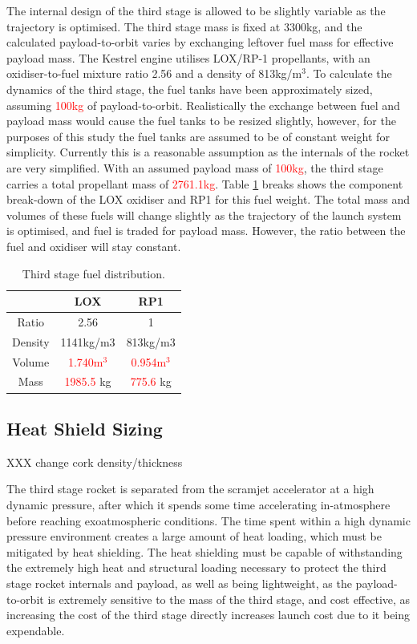 The internal design of the third stage is allowed to be slightly variable as the trajectory is optimised. The third stage mass is fixed at 3300kg, and the calculated payload-to-orbit varies by exchanging leftover fuel mass for effective payload mass. The Kestrel engine utilises LOX/RP-1 propellants, with an oxidiser-to-fuel mixture ratio 2.56\cite{RPE} and a density of 813kg/m$^3$\cite{Magee}. 
To calculate the dynamics of the third stage, the fuel tanks have been approximately sized, assuming \textcolor{red}{100kg} of payload-to-orbit. Realistically the exchange between fuel and payload mass would cause the fuel tanks to be resized slightly, however, for the purposes of this study the fuel tanks are assumed to be of constant weight for simplicity. Currently this is a reasonable assumption as the internals of the rocket are very simplified. With an assumed payload mass of \textcolor{red}{100kg}, the third stage carries a total propellant mass of \textcolor{red}{2761.1kg}. Table \ref{tab:Fuel} breaks shows the component break-down of the LOX oxidiser and RP1 for this fuel weight. The total mass and volumes of these fuels will change slightly as the trajectory of the launch system is optimised, and fuel is traded for payload mass. However, the ratio between the fuel and oxidiser will stay constant. 

	

\begin{table}[h]
	\centering
	\begin{tabular}{|c|c|c|}
		\hline  & \textbf{LOX} & \textbf{RP1} \\ 
		\hline Ratio & 2.56\cite{RPE} & 1 \\ 
		\hline Density & 1141kg/m3 & 813kg/m3\cite{Magee}\\ 
		\hline Volume & \textcolor{red}{1.740m$^3$} & \textcolor{red}{0.954m$^3$} \\ 
		\hline Mass & \textcolor{red}{1985.5} kg & \textcolor{red}{775.6} kg \\ 
		\hline 
	\end{tabular} 
	\caption{Third stage fuel distribution.} %
	\label{tab:Fuel}
\end{table}



\subsection{Heat Shield Sizing}
XXX change cork density/thickness

The third stage rocket is separated from the scramjet accelerator at a high dynamic pressure, after which it spends some time accelerating in-atmosphere before reaching exoatmospheric conditions. The time spent within a high dynamic pressure environment creates a large amount of heat loading, which must be mitigated by heat shielding. The heat shielding must be capable of withstanding the extremely high heat and structural loading necessary to protect the third stage rocket internals and payload, as well as being lightweight, as the payload-to-orbit is extremely sensitive to the mass of the third stage, and cost effective, as increasing the cost of the third stage directly increases launch cost due to it being expendable. 


